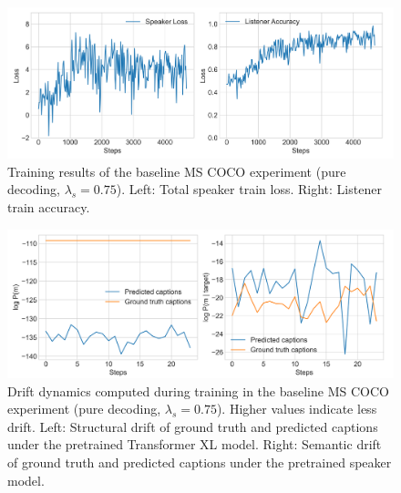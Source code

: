 \begin{figure}[h]
	\centering
	\includegraphics[width=\linewidth]{images/coco_refgame_4000_pure_075_random.png}
	\caption{Training results of the baseline MS COCO experiment (pure decoding, $\lambda_s = 0.75$). Left: Total speaker train loss. Right: Listener train accuracy.}
	\label{fig:coco_baseline_075_speaker_loss_listener_acc}
\end{figure}

\begin{figure}[h]
	\centering
	\includegraphics[width=\linewidth]{images/coco_structural_semantic_drift_4000_pure_075_random.png}
	\caption{Drift dynamics computed during training in the baseline MS COCO experiment (pure decoding, $\lambda_s = 0.75$). Higher values indicate less drift. Left: Structural drift of ground truth and predicted captions under the pretrained Transformer XL model. Right: Semantic drift of ground truth and predicted captions under the pretrained speaker model.\protect\footnotemark}
	\label{fig:coco_baseline_075_str_drift}
\end{figure}

